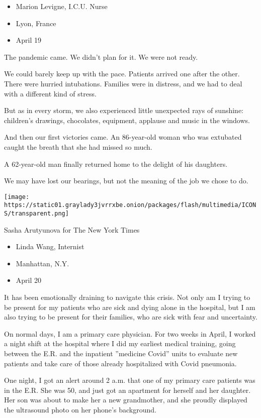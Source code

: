 \begin{itemize}
\tightlist
\item
  Marion Levigne, I.C.U. Nurse
\item
  Lyon, France
\item
  April 19
\end{itemize}

The pandemic came. We didn't plan for it. We were not ready.

We could barely keep up with the pace. Patients arrived one after the
other. There were hurried intubations. Families were in distress, and we
had to deal with a different kind of stress.

But as in every storm, we also experienced little unexpected rays of
sunshine: children's drawings, chocolates, equipment, applause and music
in the windows.

And then our first victories came. An 86-year-old woman who was
extubated caught the breath that she had missed so much.

A 62-year-old man finally returned home to the delight of his daughters.

We may have lost our bearings, but not the meaning of the job we chose
to do.

\texttt{[image: https://static01.graylady3jvrrxbe.onion/packages/flash/multimedia/ICONS/transparent.png]}

Sasha Arutyunova for The New York Times

\begin{itemize}
\tightlist
\item
  Linda Wang, Internist
\item
  Manhattan, N.Y.
\item
  April 20
\end{itemize}

It has been emotionally draining to navigate this crisis. Not only am I
trying to be present for my patients who are sick and dying alone in the
hospital, but I am also trying to be present for their families, who are
sick with fear and uncertainty.

On normal days, I am a primary care physician. For two weeks in April, I
worked a night shift at the hospital where I did my earliest medical
training, going between the E.R. and the inpatient ''medicine Covid''
units to evaluate new patients and take care of those already
hospitalized with Covid pneumonia.

One night, I got an alert around 2 a.m. that one of my primary care
patients was in the E.R. She was 50, and just got an apartment for
herself and her daughter. Her son was about to make her a new
grandmother, and she proudly displayed the ultrasound photo on her
phone's background.

